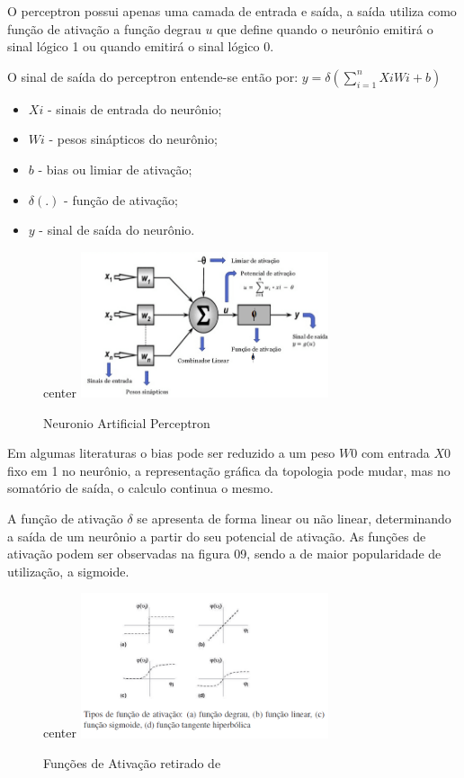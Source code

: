 \documentclass[	12pt, Times, openright, twoside, a4paper, english, brazil]{abntex2}
\begin{document}
            O perceptron \cite{Flavia2014} possui apenas uma camada de entrada e saída, a saída utiliza como função de ativação a função degrau $u$ que define quando o neurônio emitirá o sinal lógico 1 ou quando emitirá o sinal lógico 0.

            O sinal de saída do perceptron entende-se então por:
            $y= \delta(\sum_{i=1}^{n}XiWi+b)$
            \begin{itemize}
            	\item $ Xi $ - sinais de entrada do neurônio;
            	\item $ Wi $ - pesos sinápticos do neurônio;
            	\item $ b $ - bias ou limiar de ativação;
            	\item $ \delta(.) $ - função de ativação;
            	\item $ y $ - sinal de saída do neurônio.
            \end{itemize}
			
            \begin{figure}[!ht]
            	center{
              \includegraphics[width=0.65\textwidth]
              {08-perceptron.png}
            }
            \caption{Neuronio Artificial Perceptron\label{fig:perceptron}}
            \end{figure}
			
			Em algumas literaturas o bias pode ser reduzido a um peso $W0$ com entrada $X0$ fixo em 1 no neurônio, a representação gráfica da topologia pode mudar, mas no somatório de saída, o calculo continua o mesmo.
			
			A função de ativação $\delta$ se apresenta de forma linear ou não linear, determinando a saída de um neurônio a partir do seu potencial de ativação. 
			As funções de ativação podem ser observadas na figura 09, sendo a de maior popularidade de utilização, a sigmoide.
			
			\begin{figure}[!ht]
				center{
					\includegraphics[width=0.65\textwidth]
					{09-funcoes-ativacao.png}
				}
				\caption{Funções de Ativação retirado de \cite{Flavia2014} \label{fig:perceptron}}
			\end{figure}
			
\end{document}
